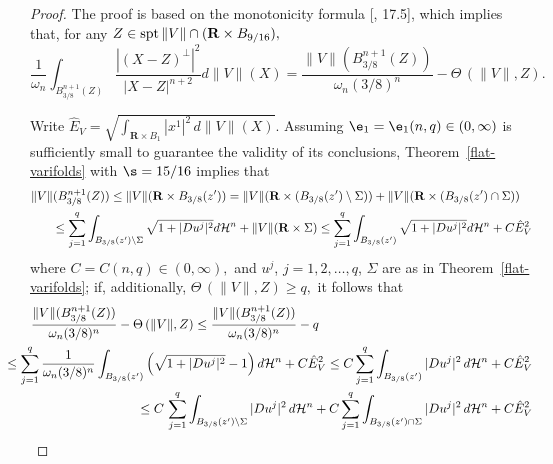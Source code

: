 \documentclass[a4paper,11pt]{amsart}
\begin{document}
\begin{proof}
The proof is based on the monotonicity formula [\cite{S1}, 17.5], which implies that, for any $Z \in {\rm spt} \, \|V\| \cap ({\mathbf R} \times B_{9/16}),$
\begin{equation}\label{monotonicity-1}
\frac{1}{\omega_{n}}\int_{B^{n+1}_{3/8}(Z)} \frac{|(X - Z)^{\perp}|^{2}}{|X - Z|^{n+2}} d\|V\|(X) = 
\frac{\|V\|(B_{3/8}^{n+1}(Z))}{\omega_{n}(3/8)^{n}} - \Theta \, (\|V\|, Z).
\end{equation}

Write ${\hat E}_{V} = \sqrt{\int_{{\mathbf R} \times B_{1}} |x^{1}|^{2} \, d\|V\|(X)}.$ Assuming $\e_{1} = \e_{1}(n, q) \in (0, \infty)$ is sufficiently small to guarantee the validity of its conclusions, Theorem~\ref{flat-varifolds} with $\s = 15/16$ implies  that 
\begin{eqnarray*}
\|V\|(B_{3/8}^{n+1}(Z)) \leq \|V\|({\mathbf R} \times B_{3/8}(z^{\prime})) = \|V\|({\mathbf R} \times (B_{3/8}(z^{\prime}) \setminus \Sigma)) + \|V\|({\mathbf R} \times (B_{3/8}(z^{\prime}) \cap \Sigma))&&\nonumber\\
&&\hspace{-6in}\leq \sum_{j=1}^{q}\int_{B_{3/8}(z^{\prime}) \setminus \Sigma} \sqrt{1 + |Du^{j}|^{2}} d{\mathcal H}^{n} 
+ \|V\|({\mathbf R} \times \Sigma) \leq \sum_{j=1}^{q}\int_{B_{3/8}(z^{\prime})} \sqrt{1 + |Du^{j}|^{2}} d{\mathcal H}^{n} + C{\hat E}_{V}^{2}
\end{eqnarray*}
where $C = C(n, q) \in (0, \infty),$ and $u^{j}$, $j=1, 2, \ldots, q$, $\Sigma$ are as in Theorem~\ref{flat-varifolds}; if, additionally, $\Theta \, (\|V\|, Z) \geq q,$ it follows that  
\begin{eqnarray}\label{monotonicity-3}
\frac{\|V\|(B_{3/8}^{n+1}(Z))}{\omega_{n}(3/8)^{n}} - \Theta \, (\|V\|, Z) \leq \frac{\|V\|(B_{3/8}^{n+1}(Z))}{\omega_{n}(3/8)^{n}} - q&&\nonumber\\
&&\hspace{-3.5in}\leq \sum_{j=1}^{q}\frac{1}{\omega_{n}(3/8)^{n}}
\int_{B_{3/8}(z^{\prime})} \left(\sqrt{1 + |Du^{j}|^{2}} - 1\right) d{\mathcal H}^{n} + C{\hat E}_{V}^{2} \leq C\sum_{j=1}^{q}\int_{B_{3/8}(z^{\prime})} |Du^{j}|^{2} \, d{\mathcal H}^{n} + C{\hat E}_{V}^{2}\nonumber\\
&&\hspace{-3.5in} \leq C \, \sum_{j=1}^{q}\int_{B_{3/8}(z^{\prime}) \setminus \Sigma} |Du^{j}|^{2} \, d{\mathcal H}^{n} + 
C\sum_{j=1}^{q}\int_{B_{3/8}(z^{\prime}) \cap \Sigma} |Du^{j}|^{2} \, d{\mathcal H}^{n} + C{\hat E}_{V}^{2}\nonumber\\

\end{eqnarray}
\end{proof}
\end{document}
